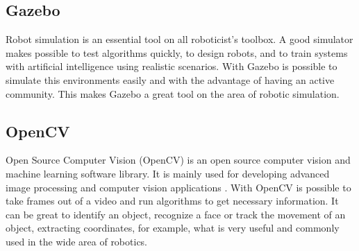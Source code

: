 \subsection*{Gazebo}

Robot simulation is an essential tool on all roboticist's toolbox.
A good simulator makes possible to test algorithms quickly, to design robots, and to train systems with artificial intelligence using realistic scenarios.
With Gazebo \cite{fairchild2016ros} is possible to simulate this environments easily and with the advantage of having an active community.
This makes Gazebo a great tool on the area of robotic simulation.

\subsection*{OpenCV}

Open Source Computer Vision (OpenCV) is an open source computer vision and machine learning software library.
It is mainly used for developing advanced image processing and computer vision applications \cite{bradski2008learning}.
With OpenCV is possible to take frames out of a video and run algorithms to get necessary information.
It can be great to identify an object, recognize a face or track the movement of an object, extracting coordinates, for example, what is very useful and commonly used in the wide area of robotics.
